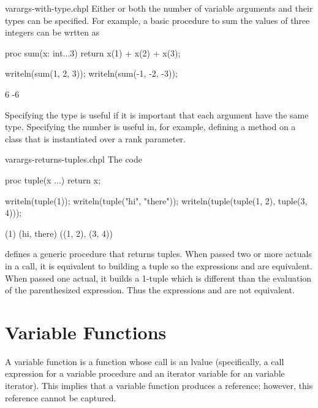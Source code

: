 \begin{chapelexample}{varargs-with-type.chpl}
Either or both the number of variable arguments and their types can be
specified.  For example, a basic procedure to sum the values of three
integers can be wrtten as
\begin{chapel}
proc sum(x: int...3) return x(1) + x(2) + x(3);
\end{chapel}
\begin{chapelpost}
writeln(sum(1, 2, 3));
writeln(sum(-1, -2, -3));
\end{chapelpost}
\begin{chapeloutput}
6
-6
\end{chapeloutput}
Specifying the type is useful if it is important that each argument
have the same type.  Specifying the number is useful in, for example,
defining a method on a class that is instantiated over a rank
parameter.
\end{chapelexample}

\begin{chapelexample}{varargs-returns-tuples.chpl}
The code
\begin{chapel}
proc tuple(x ...) return x;
\end{chapel}
\begin{chapelpost}
writeln(tuple(1));
writeln(tuple("hi", "there"));
writeln(tuple(tuple(1, 2), tuple(3, 4)));
\end{chapelpost}
\begin{chapeloutput}
(1)
(hi, there)
((1, 2), (3, 4))
\end{chapeloutput}
defines a generic procedure that returns tuples.  When passed two or
more actuals in a call, it is equivalent to building a tuple so the
expressions  and  are equivalent.  When
passed one actual, it builds a 1-tuple which is different than the
evaluation of the parenthesized expression.  Thus the
expressions  and  are not equivalent.
\end{chapelexample}


\section{Variable Functions}
\label{Variable_Functions}

A variable function is a function whose call is an lvalue
(specifically, a call expression for a variable procedure and
an iterator variable for an variable iterator).
This implies that a variable function produces a reference;
however, this
reference cannot be captured.

